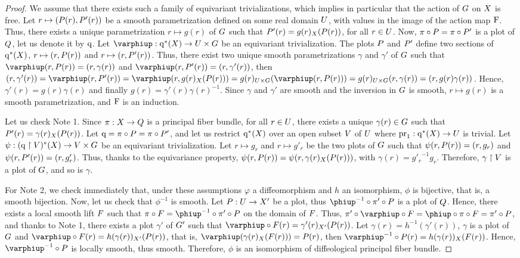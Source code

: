 \begin{proof}
  We assume that there exists such a family of equivariant trivializations,
  which implies in particular that the action of $\G$ on $\X$ is free.
  Let $r \mapsto(\P(r), \P'(r))$ be a smooth parametrization defined on some real domain $\U$,
  with values in the image of the action map $\eF$.
  Thus,
  there exists a unique parametrization $r \mapsto g(r)$ of $\G$ such that $\P'(r) = g(r)_\X(\P(r))$,
  for all $r \in \U$.
  Now,
  $\pi \circ \P = \pi \circ \P'$ is a plot of $\Q$,
  let us denote it by $\eq$.
  Let $\phi : \eq^*(\X) \to \U \times \G$ be an equivariant trivialization.
  The plots $\P$ and $\P'$ define two sections of $\eq^*(\X)$,
  $r \mapsto (r, \P(r))$ and $r \mapsto (r, \P'(r))$.
  Thus,
  there exist two unique smooth parametrizations $\gamma$ and $\gamma'$ of $\G$ such that $\phi(r,\P(r)) = (r, \gamma(r))$ and $\phi(r,\P'(r)) = (r, \gamma'(r))$,
  then $(r, \gamma'(r)) = \phi(r,\P'(r)) = \phi(r, g(r)_\X(\P(r))) = g(r)_{\U \times \G}(\phi(r, \P(r))) = g(r)_{\U \times \G}(r, \gamma(r)) = (r, g(r) \gamma(r))$.
  Hence,
  $\gamma'(r) = g(r) \gamma(r)$ and finally $g(r) = \gamma'(r) \gamma(r)^{-1}$.
  Since $\gamma$ and $\gamma'$ are smooth and the inversion in $\G$ is smooth,
  $r \mapsto g(r)$ is a smooth parametrization,
  and $\eF$ is an induction.
  
  Let us check Note 1.
  Since $\pi : \X \to \Q$ is a principal fiber bundle,
  for all $r \in \U$,
  there exists a unique $\gamma(r) \in \G$ such that $\P'(r) = \gamma(r)_\X(\P(r))$.
  Let $\eq = \pi \circ \P = \pi \circ \P'$,
  and let us restrict $\eq^*(\X)$ over an open subset $\V$ of $\U$ where $\pr_1: \eq^*(\X) \to \U$ is trivial.
  Let $\psi : (\eq\restriction \V)^*(\X) \to \V \times \G$ be an equivariant trivialization.
  Let $r \mapsto g_r$ and $r \mapsto g'_r$ be the two plots of $\G$ such that $\psi(r,\P(r)) = (r, g_r)$ and $\psi(r,\P'(r)) = (r, g'_r)$.
  Thus,
  thanks to the equivariance property,
  $\psi(r,\P(r)) = \psi(r,\gamma(r)_\X(\P(r)))$,
  with $\gamma(r) = {g'_r}^{-1}g_r$.
  Therefore, $\gamma \restriction \V$ is a plot of $\G$,
  and so is $\gamma$.
  
  For Note 2,
  we check immediately that,
  under these assumptions $\varphi$ a diffeomorphism and $h$ an isomorphism,
  $\phi$ is bijective,
  that is,
  a smooth bijection.
  Now,
  let us check that $\phi^{-1}$ is smooth.
  Let $\P : \U \to \X'$ be a plot,
  thus $\varphi^{-1} \circ \pi' \circ \P$ is a plot of $\Q$.
  Hence,
  there exists a local smooth lift $\F$ such that $\pi \circ \F = \varphi^{-1} \circ \pi' \circ \P$ on the domain of $\F$.
  Thus,
  $\pi' \circ \phi \circ \F = \varphi \circ \pi \circ \F = \pi' \circ \P$,
  and thanks to Note 1,
  there exists a plot $\gamma'$ of $\G'$ such that $\phi \circ \F(r) = \gamma'(r)_{\X'}(\P(r))$.
  Let $\gamma(r) = h^{-1}(\gamma'(r))$, $\gamma$ is a plot of $\G$ and $\phi \circ \F(r) = h(\gamma(r))_{\X'}(\P(r))$,
  that is,
  $\phi (\gamma(r)_\X(\F(r))) = \P(r)$,
  then $\phi^{-1} \circ \P(r) = h(\gamma(r))_\X(\F(r))$.
  Hence,
  $\phi^{-1} \circ \P$ is locally smooth, thus smooth.
  Therefore, $\phi$ is an isomorphism of diffeological principal fiber bundle.
\end{proof}


